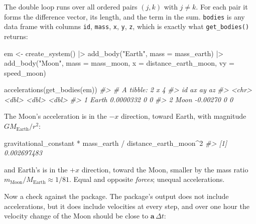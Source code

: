 \documentclass[
  10.5pt,
  letterpaper,
]{scrbook}
\newenvironment{Shaded}{\begin{snugshade}}{\end{snugshade}}
\newcommand{\AttributeTok}[1]{\textcolor[rgb]{0.00,0.00,0.00}{#1}}
\newcommand{\CommentTok}[1]{\textcolor[rgb]{0.00,0.00,0.00}{\textit{#1}}}
\newcommand{\DecValTok}[1]{\textcolor[rgb]{0.00,0.00,0.00}{#1}}
\newcommand{\FunctionTok}[1]{\textcolor[rgb]{0.00,0.00,0.00}{#1}}
\newcommand{\NormalTok}[1]{\textcolor[rgb]{0.00,0.00,0.00}{#1}}
\newcommand{\OtherTok}[1]{\textcolor[rgb]{0.00,0.00,0.00}{#1}}
\newcommand{\SpecialCharTok}[1]{\textcolor[rgb]{0.00,0.00,0.00}{#1}}
\newcommand{\StringTok}[1]{\textcolor[rgb]{0.00,0.00,0.00}{#1}}
\theoremstyle{definition}
\theoremstyle{plain}
\theoremstyle{remark}
\begin{document}
The double loop runs over all ordered pairs \((j, k)\) with
\(j \neq k\). For each pair it forms the difference vector, its length,
and the term in the sum. \texttt{bodies} is any data frame with columns
\texttt{id}, \texttt{mass}, \texttt{x}, \texttt{y}, \texttt{z}, which is
exactly what \texttt{get\_bodies()} returns:

\begin{Shaded}
\begin{Highlighting}[]
\NormalTok{em }\OtherTok{\textless{}{-}} \FunctionTok{create\_system}\NormalTok{() }\SpecialCharTok{|\textgreater{}}
  \FunctionTok{add\_body}\NormalTok{(}\StringTok{"Earth"}\NormalTok{, }\AttributeTok{mass =}\NormalTok{ mass\_earth) }\SpecialCharTok{|\textgreater{}}
  \FunctionTok{add\_body}\NormalTok{(}\StringTok{"Moon"}\NormalTok{,  }\AttributeTok{mass =}\NormalTok{ mass\_moon, }\AttributeTok{x =}\NormalTok{ distance\_earth\_moon, }\AttributeTok{vy =}\NormalTok{ speed\_moon)}

\FunctionTok{accelerations}\NormalTok{(}\FunctionTok{get\_bodies}\NormalTok{(em))}
\CommentTok{\#\textgreater{} \# A tibble: 2 x 4}
\CommentTok{\#\textgreater{}   id            ax    ay    az}
\CommentTok{\#\textgreater{}   \textless{}chr\textgreater{}      \textless{}dbl\textgreater{} \textless{}dbl\textgreater{} \textless{}dbl\textgreater{}}
\CommentTok{\#\textgreater{} 1 Earth  0.0000332     0     0}
\CommentTok{\#\textgreater{} 2 Moon  {-}0.00270       0     0}
\end{Highlighting}
\end{Shaded}

The Moon's acceleration is in the \(-x\) direction, toward Earth, with
magnitude \(G M_{\mathrm{Earth}}/r^2\):

\begin{Shaded}
\begin{Highlighting}[]
\NormalTok{gravitational\_constant }\SpecialCharTok{*}\NormalTok{ mass\_earth }\SpecialCharTok{/}\NormalTok{ distance\_earth\_moon}\SpecialCharTok{\^{}}\DecValTok{2}
\CommentTok{\#\textgreater{} [1] 0.002697483}
\end{Highlighting}
\end{Shaded}

and Earth's is in the \(+x\) direction, toward the Moon, smaller by the
mass ratio \(m_{\mathrm{Moon}}/M_{\mathrm{Earth}} \approx 1/81\). Equal
and opposite \emph{forces}; unequal accelerations.

Now a check against the package. The package's output does not include
accelerations, but it does include velocities at every step, and over
one hour the velocity change of the Moon should be close to
\(\mathbf{a}\,\Delta t\):
\end{document}

